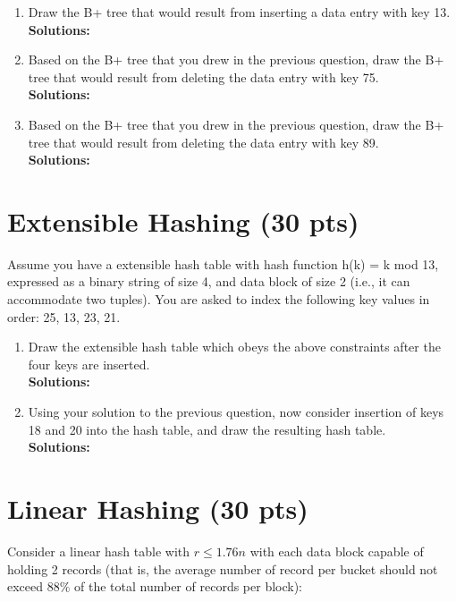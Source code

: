 \documentclass[paper=a4, fontsize=11pt]{scrartcl}
\numberwithin{equation}{section}        %
\numberwithin{figure}{section}          %
\numberwithin{table}{section}               %
\begin{document}
\begin{enumerate}
    \item Draw the B+ tree that would result from inserting a data entry with key 13.\\
    \textbf{Solutions: }


    \item Based on the B+ tree that you drew in the previous question, draw the B+ tree that would result from deleting the data entry with key 75.\\
    \textbf{Solutions: }


    \item Based on the B+ tree that you drew in the previous question, draw the B+ tree that would result from deleting the data entry with key 89.\\
    \textbf{Solutions: }


\end{enumerate}


\section{Extensible Hashing (30 pts)}

Assume you have a extensible hash table with hash function h(k) = k mod 13, expressed as a binary string of size 4, and data block of size 2 (i.e., it can accommodate two tuples). You are asked to index the following key values in order: 25, 13, 23, 21.

\begin{enumerate}
    \item Draw the extensible hash table which obeys the above constraints after the four keys are inserted.\\
    \textbf{Solutions: }


    \item Using your solution to the previous question, now consider insertion of keys 18 and 20 into the hash table, and draw the resulting hash table.\\
    \textbf{Solutions: }


\end{enumerate}



\section{Linear Hashing (30 pts)}

Consider a linear hash table with $r \leq 1.76n$ with each data block capable of holding 2 records (that is, the average number of record per bucket should not exceed $88\%$ of the total number of records per block):
\end{document}
